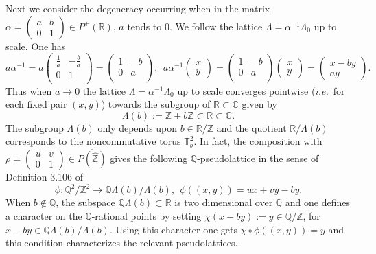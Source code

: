\documentclass[graybox, envcountsect%
]{svmult}
\def\C{{\mathbb C}}
\def\Q{{\mathbb Q}}
\def\R{{\mathbb R}}
\def\Z{{\mathbb Z}}
\def\T{{\mathbb T}}
\newcommand{\ie}{{\it i.e.\/}\ }
\begin{document}
Next we consider the degeneracy  occurring when in the matrix $\alpha=\begin{pmatrix} a &b \\ 0 &1 \end{pmatrix}\in P^+(\R)$, $a$ tends to $0$. We follow the lattice $\Lambda=\alpha^{-1}\Lambda_0$ up to scale. One has 
$$
a\alpha^{-1}=a\left(
\begin{array}{cc}
 \frac{1}{a} & -\frac{b}{a} \\
 0 & 1 \\
\end{array}
\right)= \left(
\begin{array}{cc}
 1 & -b \\
 0 & a \\
\end{array}
\right), \ \ a\alpha^{-1}\begin{pmatrix} x \\ y \end{pmatrix}=
\left(
\begin{array}{cc}
 1 & -b \\
 0 & a \\
\end{array}
\right)\begin{pmatrix} x \\ y \end{pmatrix}=\begin{pmatrix} x-by \\ ay \end{pmatrix}.
$$
Thus when $a\to 0$ the lattice $\Lambda=\alpha^{-1}\Lambda_0$ up to scale converges pointwise (\ie for each fixed pair $(x,y)$) towards the subgroup of $\R\subset \C$ given by 
\begin{equation}\label{lambdab}
 \Lambda(b):=\Z+b\Z\subset \R\subset \C.
\end{equation}
The subgroup $\Lambda(b)$ only depends upon $b\in \R/\Z$ and the quotient $\R/\Lambda(b)$ corresponds to the noncommutative torus $\T^2_b$. In fact, the composition with $\rho=\begin{pmatrix} u &v \\ 0 &1 \end{pmatrix} \in  \overline{P(\hat \Z)}$ gives the following $\Q$-pseudolattice in the sense of Definition 3.106 of \cite{cmbook}
$$
\phi:\Q^2/\Z^2\to \Q \Lambda(b)/\Lambda(b), \ \ \phi((x,y))=u x+v y -b y.
$$
When $b\notin \Q$, the subspace $\Q \Lambda(b)\subset \R$ is two dimensional over $\Q$ and one defines a character on the $\Q$-rational points by setting $\chi(x-by):=y\in \Q/\Z$, for $x-by\in \Q \Lambda(b)/\Lambda(b)$. Using this character one gets $\chi\circ \phi((x,y))=y$ and this condition characterizes the relevant pseudolattices. 
\end{document}
